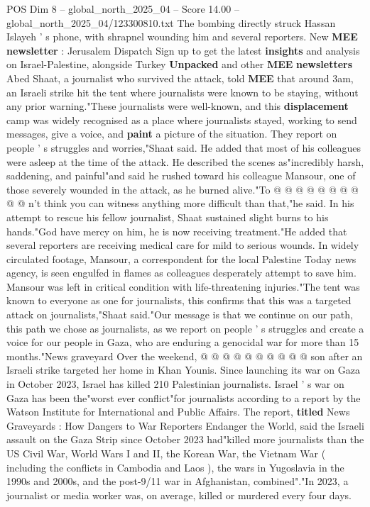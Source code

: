\begin{textsample}{POS Dim 8 – global\_north\_2025\_04 – Score 14.00 – global\_north\_2025\_04/123300810.txt}  \label{ex:f8_pos_021}
The bombing directly struck Hassan Islayeh ' s phone, with shrapnel wounding him and several reporters.
New \textbf{MEE} \textbf{newsletter} : Jerusalem Dispatch Sign up to get the latest \textbf{insights} and analysis on Israel-Palestine, alongside Turkey \textbf{Unpacked} and other \textbf{MEE} \textbf{newsletters} Abed Shaat, a journalist who survived the attack, told \textbf{MEE} that around 3am, an Israeli strike hit the tent where journalists were known to be staying, without any prior warning."These journalists were well-known, and this \textbf{displacement} camp was widely recognised as a place where journalists stayed, working to send messages, give a voice, and \textbf{paint} a picture of the situation.
They report on people ' s struggles and worries,"Shaat said.
He added that most of his colleagues were asleep at the time of the attack.
He described the scenes as"incredibly harsh, saddening, and painful"and said he rushed toward his colleague Mansour, one of those severely wounded in the attack, as he burned alive."To @ @ @ @ @ @ @ @ @ @ n't think you can witness anything more difficult than that,"he said.
In his attempt to rescue his fellow journalist, Shaat sustained slight burns to his hands."God have mercy on him, he is now receiving treatment."He added that several reporters are receiving medical care for mild to serious wounds.
In widely circulated footage, Mansour, a correspondent for the local Palestine Today news agency, is seen engulfed in flames as colleagues desperately attempt to save him.
Mansour was left in critical condition with life-threatening injuries."The tent was known to everyone as one for journalists, this confirms that this was a targeted attack on journalists,"Shaat said."Our message is that we continue on our path, this path we chose as journalists, as we report on people ' s struggles and create a voice for our people in Gaza, who are enduring a genocidal war for more than 15 months."News graveyard Over the weekend, @ @ @ @ @ @ @ @ @ @ son after an Israeli strike targeted her home in Khan Younis.
Since launching its war on Gaza in October 2023, Israel has killed 210 Palestinian journalists.
Israel ' s war on Gaza has been the"worst ever conflict"for journalists according to a report by the Watson Institute for International and Public Affairs.
The report, \textbf{titled} News Graveyards : How Dangers to War Reporters Endanger the World, said the Israeli assault on the Gaza Strip since October 2023 had"killed more journalists than the US Civil War, World Wars I and II, the Korean War, the Vietnam War ( including the conflicts in Cambodia and Laos ), the wars in Yugoslavia in the 1990s and 2000s, and the post-9/11 war in Afghanistan, combined"."In 2023, a journalist or media worker was, on average, killed or murdered every four days.

\end{textsample}
